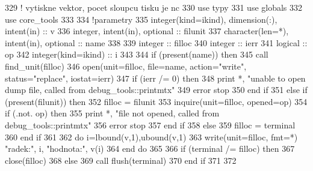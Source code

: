 \begin{DoxyCode}
329     \textcolor{comment}{! vytiskne vektor, pocet sloupcu tisku je nc}
330       \textcolor{keywordtype}{use }typy
331       \textcolor{keywordtype}{use }globals
332       \textcolor{keywordtype}{use }core_tools
333       
334       \textcolor{comment}{!parametry}
335       \textcolor{keywordtype}{integer(kind=ikind)}, \textcolor{keywordtype}{dimension(:)}, \textcolor{keywordtype}{intent(in)} :: v
336       \textcolor{keywordtype}{integer}, \textcolor{keywordtype}{intent(in)}, \textcolor{keywordtype}{optional} :: filunit   
337       \textcolor{keywordtype}{character(len=*)}, \textcolor{keywordtype}{intent(in)}, \textcolor{keywordtype}{optional} :: name
338 
339       \textcolor{keywordtype}{integer} :: filloc
340       \textcolor{keywordtype}{integer} :: ierr
341       \textcolor{keywordtype}{logical} :: op
342       \textcolor{keywordtype}{integer(kind=ikind)} :: i
343       
344       \textcolor{keywordflow}{if} (\textcolor{keyword}{present}(name)) \textcolor{keywordflow}{then}
345         \textcolor{keyword}{call }find_unit(filloc)
346         \textcolor{keyword}{open}(unit=filloc, file=name, action=\textcolor{stringliteral}{"write"}, status=\textcolor{stringliteral}{"replace"}, iostat=ierr)
347         \textcolor{keywordflow}{if} (ierr /= 0) \textcolor{keywordflow}{then}
348           print *, \textcolor{stringliteral}{"unable to open dump file, called from debug\_tools::printmtx"}
349           error stop
350 \textcolor{keywordflow}{        end if}
351       \textcolor{keywordflow}{else} \textcolor{keywordflow}{if} (\textcolor{keyword}{present}(filunit)) \textcolor{keywordflow}{then}
352         filloc = filunit
353         \textcolor{keyword}{inquire}(unit=filloc, opened=op)
354         \textcolor{keywordflow}{if} (.not. op) \textcolor{keywordflow}{then}
355           print *, \textcolor{stringliteral}{"file not opened, called from debug\_tools::printmtx"}
356           error stop
357 \textcolor{keywordflow}{        end if}
358       \textcolor{keywordflow}{else}
359         filloc = terminal
360 \textcolor{keywordflow}{      end if}
361 
362       \textcolor{keywordflow}{do} i=lbound(v,1),ubound(v,1)
363          \textcolor{keyword}{write}(unit=filloc, fmt=*) \textcolor{stringliteral}{"radek:"}, i, \textcolor{stringliteral}{"hodnota:"}, v(i)
364 \textcolor{keywordflow}{      end do}
365   
366       \textcolor{keywordflow}{if} (terminal /= filloc) \textcolor{keywordflow}{then}
367         \textcolor{keyword}{close}(filloc)
368       \textcolor{keywordflow}{else}
369         \textcolor{keyword}{call }flush(terminal)
370 \textcolor{keywordflow}{      end if}
371   
372 
\end{DoxyCode}
